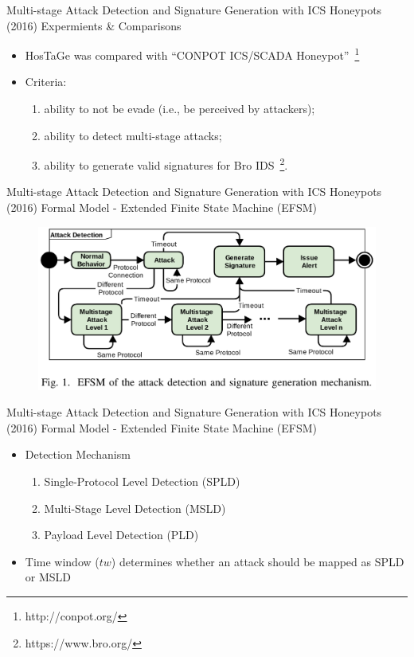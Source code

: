 \documentclass[compress]{beamer}
\begin{document}
\begin{frame}{Multi-stage Attack Detection and Signature Generation with ICS Honeypots (2016)}
    Expermients \& Comparisons
    \begin{itemize}
     \item HosTaGe was compared with ``CONPOT ICS/SCADA Honeypot''~\footnote{http://conpot.org/}
     \item Criteria:
     \begin{enumerate}
      \item ability to not be evade (i.e., be perceived by attackers);
      \item ability to detect multi-stage attacks;
      \item ability to generate valid signatures for Bro IDS~\footnote{https://www.bro.org/}.
     \end{enumerate}
    \end{itemize}
\end{frame}
\begin{frame}{Multi-stage Attack Detection and Signature Generation with ICS Honeypots (2016)}
    Formal Model - Extended Finite State Machine (EFSM)
    \begin{figure}
    \centering
    \includegraphics[width=1.0\textwidth]{./images/hostage-efsm.png}
    \label{fig:hostage-efsm}
    \end{figure}
\end{frame}
\begin{frame}{Multi-stage Attack Detection and Signature Generation with ICS Honeypots (2016)}
    Formal Model - Extended Finite State Machine (EFSM)
    \begin{itemize}
     \item Detection Mechanism
     \begin{enumerate}
      \item Single-Protocol Level Detection (SPLD)
      \item Multi-Stage Level Detection (MSLD)
      \item Payload Level Detection (PLD)
     \end{enumerate}
     \item Time window ($tw$) determines whether an attack should be mapped as SPLD or MSLD
    \end{itemize}
\end{frame}
\end{document}

